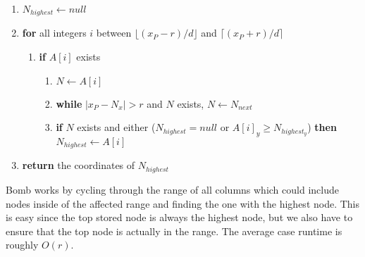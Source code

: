 \documentclass{article}
\begin{document}
\begin{enumerate}
    \item $N_{highest} \leftarrow null$
    \item \textbf{for} all integers $i$ between $\lfloor (x_P-r)/d \rfloor$ and  $\lceil (x_P+r)/d \rceil$
    \begin{enumerate}
        \item \textbf{if} $A[i]$ exists 
        \begin{enumerate}
            \item $N \leftarrow A[i]$
            \item \textbf{while} $|x_P-N_x| > r$ and $N$ exists, $N \leftarrow N_{next}$
            \item \textbf{if} $N$ exists and either ($N_{highest} = null$ or $A[i]_y \geq N_{highest_y}$) \textbf{then} $N_{highest} \leftarrow A[i]$
         \end{enumerate}
    \end{enumerate}
    \item \textbf{return} the coordinates of $N_{highest}$
\end{enumerate}
Bomb works by cycling through the range of all columns which could include nodes inside of the affected range and finding the one with the highest node. This is easy since the top stored node is always the highest node, but we also have to ensure that the top node is actually in the range. The average case runtime is roughly $O(r)$.
\end{document}

